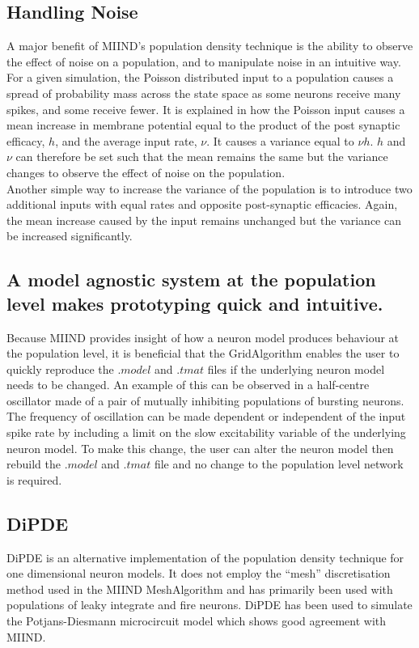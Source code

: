 \documentclass[utf8]{frontiersSCNS} %
\begin{document}
\subsection*{Handling Noise}
\label{handlingnoise}
A major benefit of MIIND's population density technique is the ability to observe the effect of noise on a population, and to manipulate noise in an intuitive way. For a given simulation, the Poisson distributed input to a population causes a spread of probability mass across the state space as some neurons receive many spikes, and some receive fewer. It is explained in \cite{de2013generic} how the Poisson input causes a mean increase in membrane potential equal to the product of the post synaptic efficacy, $h$, and the average input rate, $\nu$. It causes a variance equal to $\nu h$\texttwosuperior. $h$ and $\nu$ can therefore be set such that the mean remains the same but the variance changes to observe the effect of noise on the population.\\
Another simple way to increase the variance of the population is to introduce two additional inputs with equal rates and opposite post-synaptic efficacies. Again, the mean increase caused by the input remains unchanged but the variance can be increased significantly.\\

\subsection*{A model agnostic system at the population level makes prototyping quick and intuitive.}
Because MIIND provides insight of how a neuron model produces behaviour at the population level, it is beneficial that the GridAlgorithm enables the user to quickly reproduce the $.model$ and $.tmat$ files if the underlying neuron model needs to be changed. An example of this can be observed in a half-centre oscillator made of a pair of mutually inhibiting populations of bursting neurons. The frequency of oscillation can be made dependent or independent of the input spike rate by including a limit on the slow excitability variable of the underlying neuron model. To make this change, the user can alter the neuron model then rebuild the $.model$ and $.tmat$ file and no change to the population level network is required.\\

\subsection*{DiPDE}
DiPDE \citep{dipdewebsite,iyer2013influence} is an alternative implementation of the population density technique for one dimensional neuron models. It does not employ the ``mesh'' discretisation method used in the MIIND MeshAlgorithm and has primarily been used with populations of leaky integrate and fire neurons. DiPDE has been used to simulate the Potjans-Diesmann microcircuit model \citep{cain2016computational} which shows good agreement with MIIND.\\
\end{document}
